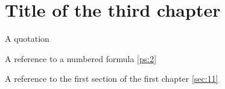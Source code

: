 \chapter{Title of the third chapter}
A quotation \cite{APS1}

A reference to a numbered formula \eqref{ps:2}

A reference to the first section of the first chapter \ref{sec:11}

\newpage
$ $
